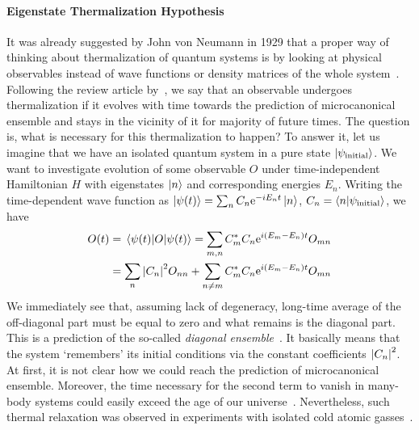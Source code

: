 \paragraph{Eigenstate Thermalization Hypothesis}It was already suggested by John von Neumann in 1929 that a proper way of
thinking about thermalization of quantum systems is by looking at physical
observables instead of wave functions or density matrices of the whole system~\autocite{Neumann192930}.
Following the review article by~\textcite{DAlessio2016}, we say that an 
observable undergoes thermalization if it evolves with time towards the
prediction of microcanonical ensemble and stays in the vicinity of it for majority
of future times. The question is, what is necessary for this thermalization to happen?
To answer it, let us imagine that we have an isolated quantum system in a pure
state \(\ket{\psi_{\textrm{initial}}}\). We want to investigate evolution
of some observable \(O\) under time-independent Hamiltonian \(H\) with
eigenstates \(\ket{n}\) and corresponding energies \(E_n\). Writing the time-dependent
wave function as \(\ket{\psi(t)}=\sum_{n} C_{n} \mathrm{e}^{-i E_{n} t}\ket{n}\),
 \(C_n =  \braket{n}{\psi_{\textrm{initial}}}\), we have 
\begin{align}
    O(t) & =\matrixel{\psi(t)}{O}{\psi(t)}=\sum_{m, n} C_{m}^{*} C_{n} 
    \mathrm{e}^{i\left(E_{m}-E_{n}\right) t} O_{m n} \nonumber\\
    &=\sum_{n}\abs{C_{n}}^{2} O_{nn}+\sum_{n \neq m} C_{m}^{*} C_{n} 
    \mathrm{e}^{i\left(E_{m}-E_{n}\right) t} O_{m n}\label{eq:time evolution}
\end{align}
We immediately see that, assuming lack of degeneracy, long-time average of the off-diagonal
part must be equal to zero and what remains is the diagonal part.
This is a prediction of the so-called \textit{diagonal ensemble}~\autocite{Cassidy2011}.
It basically means that the system `remembers' its initial conditions via the constant
coefficients \(\abs{C_n}^2\). At first, it is not clear how we could reach the prediction of 
microcanonical ensemble. Moreover, the time necessary for the second term to vanish 
in many-body systems could easily exceed the age of our universe~\autocite{DAlessio2016}.
Nevertheless, such thermal relaxation was observed in experiments with isolated
cold atomic gasses~\autocite{Rigol2012,Rigol2008854,Hung2010,Kinoshita2006,Hofferberth2007}.

